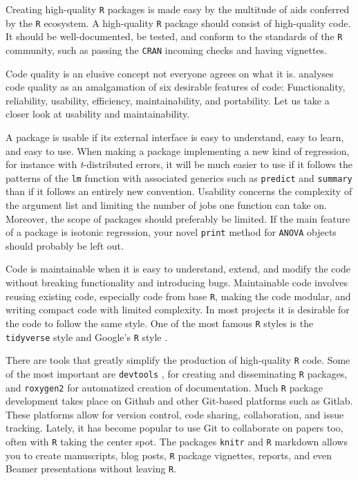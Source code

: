 Creating high-quality \texttt{R} packages is made easy by the multitude of aids conferred by the \texttt{R} ecosystem. A high-quality \texttt{R} package should consist of high-quality code. It should be well-documented, be tested, and conform to the standards of the \texttt{R} community, such as passing the \texttt{CRAN} incoming checks and having vignettes.

Code quality is an elusive concept not everyone agrees on what it is. \textcite[Section 1.1.2]{Spinellis2006-dd} analyses code quality as an amalgamation of six desirable features of code: Functionality, reliability, usability, efficiency, maintainability, and portability. Let us take a closer look at usability and maintainability.

A package is usable if its external interface is easy to understand, easy to learn, and easy to use. When making a package implementing a new kind of regression, for instance with \textit{t}-distributed errors, it will be much easier to use if it follows the patterns of the \texttt{lm} function with associated generics such as \texttt{predict} and \texttt{summary} than if it follows an entirely new convention. Usability concerns the complexity of the argument list and limiting the number of jobs one function can take on. Moreover, the scope of packages should preferably be limited. If the main feature of a package is isotonic regression, your novel \texttt{print} method for \texttt{ANOVA} objects should probably be left out.

Code is maintainable when it is easy to understand, extend, and modify the code without breaking functionality and introducing bugs. Maintainable code involves reusing existing code, especially code from base \texttt{R}, making the code modular, and writing compact code with limited complexity.  In most projects it is desirable for the code to follow the same style. One of the most famous \texttt{R} styles is the \texttt{tidyverse} style \parencite{Wickham_undated-sw} and Google's \texttt{R} style \parencite{noauthor_undated-pk}. 

There are tools that greatly simplify the production of high-quality \texttt{R} code. Some of the most important are \texttt{devtools} \parencite{devtools}, for creating and disseminating \texttt{R} packages, and \texttt{roxygen2} \parencite{roxygen2} for automatized creation of documentation. Much \texttt{R} package development takes place on Github and other Git-based platforms such as Gitlab. These platforms allow for version control, code sharing, collaboration, and issue tracking. Lately, it has become popular to use Git to collaborate on papers too, often with \texttt{R} taking the center spot. The packages \texttt{knitr} \parencite{Xie2014} and \texttt{R} markdown allows you to create manuscripts, blog posts, \texttt{R} package vignettes, reports, and even Beamer presentations without leaving \texttt{R}. 

